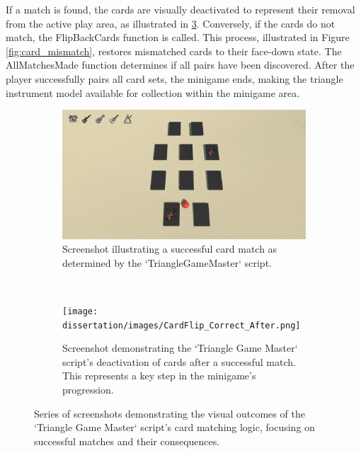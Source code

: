 \documentclass{l4proj}
\begin{document}
If a match is found, the cards are visually deactivated to represent their removal from the active play area, as illustrated in \ref{fig:card_matching_success}. Conversely, if the cards do not match, the FlipBackCards function is called. This process, illustrated in Figure \ref{fig:card_mismatch}, restores mismatched cards to their face-down state. The AllMatchesMade function determines if all pairs have been discovered. After the player successfully pairs all card sets, the minigame ends, making the triangle instrument model available for collection within the minigame area.

\begin{figure}[h]
  \centering
 \begin{subfigure}[t]{0.45\textwidth}
  \includegraphics[width=\textwidth]{dissertation/images/CardFlip_Correct_Mid.png}
  \caption{Screenshot illustrating a successful card match as determined by the `TriangleGameMaster` script.}
  \label{fig:card_match}
 \end{subfigure}
 ~
 \begin{subfigure}[t]{0.45\textwidth}
  \texttt{[image: dissertation/images/CardFlip\_Correct\_After.png]}
  \caption{Screenshot demonstrating the `Triangle Game Master` script's deactivation of cards after a successful match. This represents a key step in the minigame's progression.}
  \label{fig:card_deactivation}
 \end{subfigure}  

 \caption{Series of screenshots demonstrating the visual outcomes of the `Triangle Game Master` script's card matching logic, focusing on successful matches and their consequences.}  

 \label{fig:card_matching_success} 
\end{figure}

\end{document}
